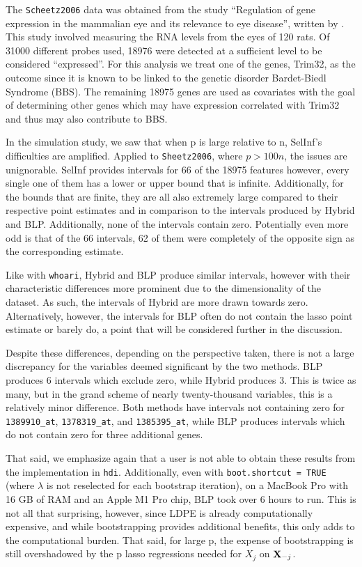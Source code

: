 The \texttt{Scheetz2006} data was obtained from the study ``Regulation of gene expression in the mammalian eye and its relevance to eye disease'', written by \cite{Scheetz2006}. This study involved measuring the RNA levels from the eyes of 120 rats. Of 31000 different probes used, 18976 were detected at a sufficient level to be considered ``expressed''. For this analysis we treat one of the genes, Trim32, as the outcome since it is known to be linked to the genetic disorder Bardet-Biedl Syndrome (BBS). The remaining 18975 genes are used as covariates with the goal of determining other genes which may have expression correlated with Trim32 and thus may also contribute to BBS. 

In the simulation study, we saw that when p is large relative to n, SelInf's difficulties are amplified. Applied to \texttt{Sheetz2006}, where $p > 100n$, the issues are unignorable. SelInf provides intervals for 66 of the 18975 features however, every single one of them has a lower or upper bound that is infinite. Additionally, for the bounds that are finite, they are all also extremely large compared to their respective point estimates and in comparison to the intervals produced by Hybrid and BLP. Additionally, none of the intervals contain zero. Potentially even more odd is that of the 66 intervals, 62 of them were completely of the opposite sign as the corresponding estimate. 

Like with \texttt{whoari}, Hybrid and BLP produce similar intervals, however with their characteristic differences more prominent due to the dimensionality of the dataset. As such, the intervals of Hybrid are more drawn towards zero. Alternatively, however, the intervals for BLP often do not contain the lasso point estimate or barely do, a point that will be considered further in the discussion.

Despite these differences, depending on the perspective taken, there is not a large discrepancy for the variables deemed significant by the two methods. BLP produces 6 intervals which exclude zero, while Hybrid produces 3. This is twice as many, but in the grand scheme of nearly twenty-thousand variables, this is a relatively minor difference. Both methods have intervals not containing zero for \texttt{1389910\_at}, \texttt{1378319\_at}, and \texttt{1385395\_at}, while BLP produces intervals which do not contain zero for three additional genes.

That said, we emphasize again that a user is not able to obtain these results from the implementation in \texttt{hdi}. Additionally, even with \texttt{boot.shortcut = TRUE} (where $\lambda$ is not reselected for each bootstrap iteration), on a MacBook Pro with 16 GB of RAM and an Apple M1 Pro chip, BLP took over 6 hours to run. This is not all that surprising, however, since LDPE is already computationally expensive, and while bootstrapping provides additional benefits, this only adds to the computational burden. That said, for large p, the expense of bootstrapping is still overshadowed by the p lasso regressions needed for $X_j$ on $\mathbf{X}_{-j}$. 

